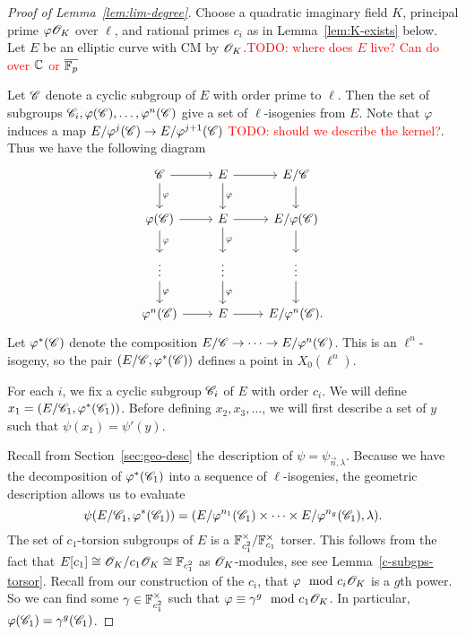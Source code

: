 \documentclass{amsart}
\begin{document}
\begin{proof}[Proof of Lemma~\ref{lem:lim-degree}]
  Choose a quadratic imaginary field $K$, principal prime $\varphi\mathscr{O}_K$ over $\ell$, and rational primes $c_i$ as in Lemma~\ref{lem:K-exists} below. Let $E$ be an elliptic curve with CM by $\mathscr{O}_K$.\textcolor{red}{TODO: where does $E$ live? Can do over $\mathbb{C}$ or $\overline{\mathbb{F}_p}$}

  Let $\mathscr{C}$ denote a cyclic subgroup of $E$ with order prime to $\ell$. Then the set of subgroups $\mathscr{C}_i, \varphi(\mathscr{C}), \dots, \varphi^n(\mathscr{C})$ give a set of $\ell$-isogenies from $E$. Note that $\varphi$ induces a map $E/\varphi^j(\mathscr{C}) \to E/\varphi^{j+1}(\mathscr{C})$ \textcolor{red}{TODO: should we describe the kernel?}. Thus we have the following diagram
  \[
    \begin{tikzcd}
      \sC \arrow[d,"\varphi"] \arrow[r] & E \arrow[d,"\varphi"] \arrow[r] & E/\sC \arrow[d]
      \\
      \varphi(\sC) \arrow[d,"\varphi"] \arrow[r] & E \arrow[d,"\varphi"] \arrow[r] & E/\varphi(\sC) \arrow[d]
      \\
      \vdots \arrow[d,"\varphi"] & \vdots \arrow[d,"\varphi"] & \vdots \arrow[d]
      \\
      \varphi^n(\sC) \arrow[r] & E \arrow[r] & E/\varphi^{n}(\sC).
    \end{tikzcd}
  \]
  Let $\varphi^{\ast}(\mathscr{C})$ denote the composition $E/\mathscr{C} \to \cdots \to E/\varphi^n(\mathscr{C})$. This is an $\ell^n$-isogeny, so the pair $(E/\mathscr{C},\varphi^{\ast}(\mathscr{C}))$ defines a point in $X_0(\ell^n)$.

  For each $i$, we fix a cyclic subgroup $\mathscr{C}_i$ of $E$ with order $c_i$. We will define $x_1 = (E/\mathscr{C}_1,\varphi^{\ast}(\mathscr{C}_1))$. Before defining $x_2,x_3,\dots$, we will first describe a set of $y$ such that $\psi(x_1) = \psi'(y)$.

  Recall from Section~\ref{sec:geo-desc} the description of $\psi = \psi_{\vec{n},\lambda}$. Because we have the decomposition of $\varphi^{\ast}(\mathscr{C}_1)$ into a sequence of $\ell$-isogenies, the geometric description allows us to evaluate
  \[
    \psi(E/\mathscr{C}_1,\varphi^{\ast}(\mathscr{C}_1)) = (E/\varphi^{n_1}(\mathscr{C}_1) \times \cdots \times E/\varphi^{n_g}(\mathscr{C}_1),\lambda).
  \]
  The set of $c_1$-torsion subgroups of $E$ is a $\mathbb{F}_{c_1^2}^\times/\mathbb{F}_{c_1}^\times$ torser. This follows from the fact that $E[c_1] \cong \mathscr{O}_K/c_1\mathscr{O}_K \cong \mathbb{F}_{c_1^2}$ as $\mathscr{O}_K$-modules, see see Lemma~\ref{c-subgps-torsor}. Recall from our construction of the $c_i$, that $\varphi \mod{c_i\mathscr{O}_K}$ is a $g$th power. So we can find some $\gamma \in \mathbb{F}_{c_1^2}^\times$ such that $\varphi \equiv \gamma^g \mod{c_1\mathscr{O}_K}$. In particular, $\varphi(\mathscr{C}_1) = \gamma^g(\mathscr{C}_1)$.


\end{proof}
\end{document}
